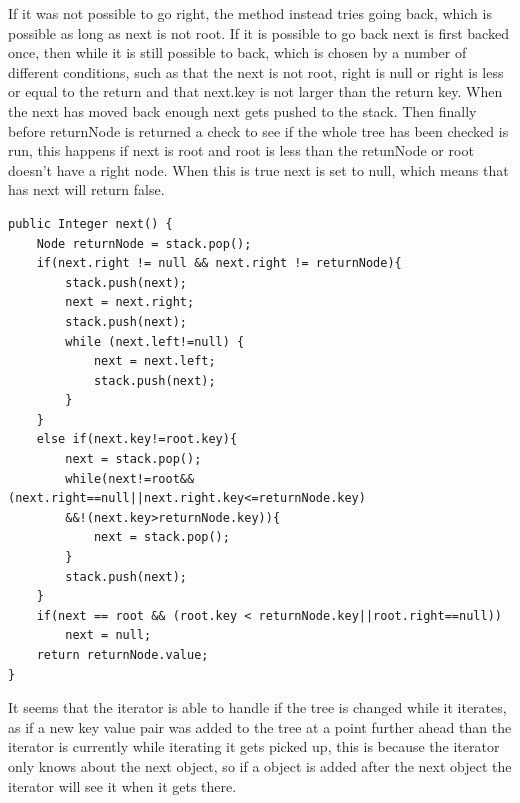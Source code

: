 \documentclass[a4paper,11pt]{article}
\begin{document}
If it was not possible to go right, the method instead tries going back, which is possible as long as next is not root. If it is possible to go back next is first backed once, then while it is still possible to back, which is chosen by a number of different conditions, such as that the next is not root, right is null or right is less or equal to the return and that next.key is not larger than the return key. 
When the next has moved back enough next gets pushed to the stack. Then finally before returnNode is returned a check to see if the whole tree has been checked is run, this happens if next is root and root is less than the retunNode or root doesn't have a right node. When this is true next is set to null, which means that has next will return false.
\begin{verbatim}
public Integer next() {
    Node returnNode = stack.pop();
    if(next.right != null && next.right != returnNode){
        stack.push(next);
        next = next.right;
        stack.push(next);
        while (next.left!=null) {
            next = next.left;
            stack.push(next);
        }
    }
    else if(next.key!=root.key){
        next = stack.pop();
        while(next!=root&&(next.right==null||next.right.key<=returnNode.key)
        &&!(next.key>returnNode.key)){    
            next = stack.pop();
        }
        stack.push(next);
    }
    if(next == root && (root.key < returnNode.key||root.right==null))
        next = null;
    return returnNode.value;
}
\end{verbatim}
It seems that the iterator is able to handle if the tree is changed while it iterates, as if a new key value pair was added to the tree at a point further ahead than the iterator is currently while 
iterating it gets picked up, this is because the iterator only knows about the next object, so if a object is added after the next object the iterator will see it when it gets there.
\end{document}
